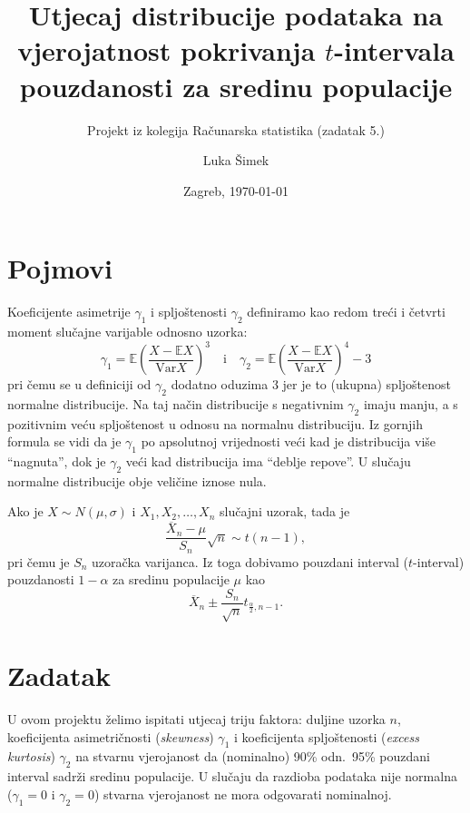 \documentclass[11pt]{scrartcl}
\date{\displaydate{date}}
\begin{document}
\title{Utjecaj distribucije podataka na vjerojatnost pokrivanja $t$-intervala pouzdanosti za sredinu populacije} \thispagestyle{empty}
\subtitle{Projekt iz kolegija Računarska statistika (zadatak 5.)}
\author{Luka Šimek}
\date{Zagreb, \today}
\maketitle
{}

\section{Pojmovi}
Koeficijente asimetrije \( \gamma_1 \) i spljoštenosti \( \gamma_2 \) definiramo kao redom treći i četvrti moment
slučajne varijable odnosno uzorka:
\[
	\gamma_1 = \mathbb E \left( \frac{X - \mathbb E X}{\text{Var} X} \right)^3
	\quad \mathrm{i} \quad
	\gamma_2 = \mathbb E \left( \frac{X - \mathbb E X}{\text{Var} X} \right)^4-3
\]
pri čemu se u definiciji od \( \gamma_2 \) dodatno oduzima \( 3 \) jer je
to (ukupna) spljoštenost normalne distribucije. Na taj način distribucije s
negativnim \( \gamma_2 \) imaju manju, a s pozitivnim veću spljoštenost
u odnosu na normalnu distribuciju. Iz gornjih formula se vidi
da je \( \gamma_1 \) po apsolutnoj vrijednosti veći kad je
distribucija više \enquote{nagnuta}, dok je \( \gamma_2 \) veći
kad distribucija ima \enquote{deblje repove}. U slučaju normalne
distribucije obje veličine iznose nula.

Ako je \( X \sim N(\mu, \sigma) \) i \( X_1, X_2, \ldots, X_n \)
slučajni uzorak, tada je 
\[
	\frac{\overline X_n - \mu}{S_n}\sqrt n \sim t(n-1),
\]
pri čemu je \( S_n \) uzoračka varijanca. Iz toga dobivamo 
pouzdani interval (\( t \)-interval) pouzdanosti \( 1-\alpha \) 
za sredinu populacije \( \mu \) kao
\[ \overline X_n \pm \frac{S_n}{\sqrt n}t_{\frac \alpha 2, n-1} .\]


\section{Zadatak}
U ovom projektu želimo ispitati utjecaj triju faktora:
duljine uzorka \( n \), koeficijenta asimetričnosti
(\textsl{skewness}) \( \gamma_1 \) i
koeficijenta spljoštenosti (\textsl{excess kurtosis})
\( \gamma_2 \) na stvarnu vjerojanost 
da (nominalno) 90\% odn.\ 95\% pouzdani interval sadrži
sredinu populacije. U slučaju da razdioba podataka
nije normalna (\( \gamma_1 = 0 \) i \( \gamma_2 = 0 \))
stvarna vjerojanost ne mora odgovarati nominalnoj.
\end{document}

